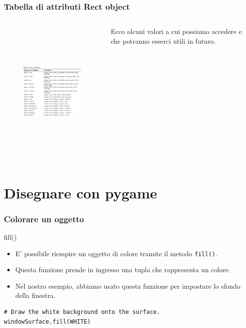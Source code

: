 \documentclass{beamer}
\begin{document}
\begin{frame}[fragile]
\frametitle{Tabella di attributi Rect object}
\begin{columns}
	\begin{column}[T]{0.7\textwidth}
		\begin{figure}[t]
			\includegraphics[height=7cm, width=7cm]{images/attributiRect.png}
		\end{figure}
	\end{column}
	\begin{column}[T]{0.3\textwidth}
		Ecco alcuni valori a cui possiamo accedere e che potranno esserci utili in futuro.\\
		
	\end{column}
\end{columns}
\end{frame}

\section{Disegnare con pygame}

\begin{frame}[fragile]
\frametitle{Colorare un oggetto}
\begin{block}{fill()}
	\begin{itemize}
		\item E' possibile riempire un oggetto di colore tramite il metodo \texttt{fill()}.
		\item Questa funzione prende in ingresso una tupla che rappresenta un colore.
		\item Nel nostro esempio, abbiamo usato questa funzione per impostare lo sfondo della finestra.
	\end{itemize}
\end{block}
\begin{lstlisting}
# Draw the white background onto the surface.
windowSurface.fill(WHITE)
\end{lstlisting}
\end{frame}
\end{document}
